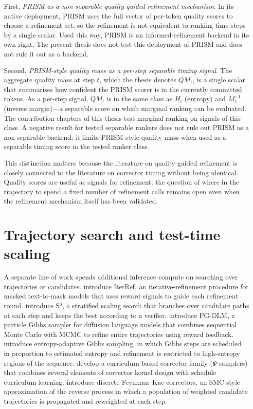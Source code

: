 First, \emph{PRISM as a non-separable quality-guided refinement
mechanism}. In its native deployment, PRISM uses the full vector of
per-token quality scores to choose a refinement set, so the refinement
is not equivalent to ranking time steps by a single scalar. Used this
way, PRISM is an informed-refinement backend in its own right. The
present thesis does not test this deployment of PRISM and does not rule
it out as a backend.

Second, \emph{PRISM-style quality mass as a per-step separable timing
signal}. The aggregate quality mass at step $t$, which the thesis denotes
$QM_t$, is a single scalar that summarises how confident the PRISM scorer
is in the currently committed tokens. As a per-step signal, $QM_t$ is in
the same class as $H_t$ (entropy) and $M_t^{-1}$ (inverse margin)---a
separable score on which marginal ranking can be evaluated. The
contribution chapters of this thesis test marginal ranking on signals of
this class. A negative result for tested separable rankers does not rule
out PRISM as a non-separable backend; it limits PRISM-style quality mass
when used as a separable timing score in the tested ranker class.

This distinction matters because the literature on quality-guided
refinement is closely connected to the literature on corrector timing
without being identical. Quality scores are useful as signals for
refinement; the question of where in the trajectory to spend a fixed
number of refinement calls remains open even when the refinement mechanism
itself has been validated.

\section{Trajectory search and test-time scaling}
\label{lit:sec:search}

A separate line of work spends additional inference compute on searching
over trajectories or candidates. \textcite{lee2025iterref} introduce
IterRef, an iterative-refinement procedure for masked text-to-mask models
that uses reward signals to guide each refinement round.
\textcite{bilal2026s3} introduce S$^3$, a stratified scaling search that
branches over candidate paths at each step and keeps the best according
to a verifier. \textcite{dang2025particlegibbs} introduce PG-DLM, a
particle Gibbs sampler for diffusion language models that combines
sequential Monte Carlo with MCMC to refine entire trajectories using
reward feedback. \textcite{koh2024eags} introduce entropy-adaptive Gibbs
sampling, in which Gibbs steps are scheduled in proportion to estimated
entropy and refinement is restricted to high-entropy regions of the
sequence. \textcite{deschenaux2026psisamplers} develop a curriculum-based
corrector family ($\Psi$-samplers) that combines several elements of
corrector kernel design with schedule curriculum learning.
\textcite{hasan2026fkc} introduce discrete Feynman--Kac correctors, an
SMC-style approximation of the reverse process in which a population of
weighted candidate trajectories is propagated and reweighted at each
step.

